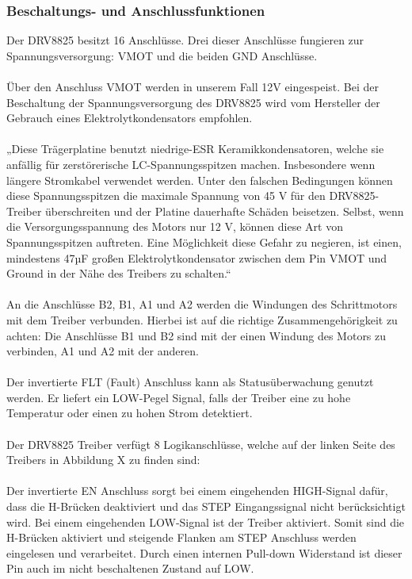 \subsubsection{Beschaltungs- und Anschlussfunktionen}
Der DRV8825 besitzt 16 Anschlüsse.
Drei dieser Anschlüsse fungieren zur Spannungsversorgung: VMOT und die beiden GND Anschlüsse. \\\\
Über den Anschluss VMOT werden in unserem Fall 12V eingespeist.
Bei der Beschaltung der Spannungsversorgung des DRV8825 wird vom Hersteller der Gebrauch eines Elektrolytkondensators empfohlen. \\\\
„Diese Trägerplatine benutzt niedrige-ESR Keramikkondensatoren, welche sie anfällig für zerstörerische LC-Spannungsspitzen machen.
Insbesondere wenn längere Stromkabel verwendet werden.
Unter den falschen Bedingungen können diese Spannungsspitzen die maximale Spannung von 45 V für den DRV8825-Treiber überschreiten und der Platine dauerhafte Schäden beisetzen.
Selbst, wenn die Versorgungsspannung des Motors nur 12 V, können diese Art von Spannungsspitzen auftreten.
Eine Möglichkeit diese Gefahr zu negieren, ist einen, mindestens 47µF großen Elektrolytkondensator zwischen dem Pin VMOT und Ground in der Nähe des Treibers zu schalten.“ \\\\
An die Anschlüsse B2, B1, A1 und A2 werden die Windungen des Schrittmotors mit dem Treiber verbunden.
Hierbei ist auf die richtige Zusammengehörigkeit zu achten:
Die Anschlüsse B1 und B2 sind mit der einen Windung des Motors zu verbinden, A1 und A2 mit der anderen. \\\\
Der invertierte FLT (Fault)  Anschluss kann als Statusüberwachung genutzt werden.
Er liefert ein LOW-Pegel Signal, falls der Treiber eine zu hohe Temperatur oder einen zu hohen Strom detektiert. \\\\
Der DRV8825 Treiber verfügt 8 Logikanschlüsse, welche auf der linken Seite des Treibers in Abbildung X zu finden sind: \\\\
Der invertierte EN Anschluss sorgt bei einem eingehenden HIGH-Signal dafür, dass die H-Brücken deaktiviert und das STEP Eingangssignal nicht berücksichtigt wird.
Bei einem eingehenden LOW-Signal ist der Treiber aktiviert.
Somit sind die H-Brücken aktiviert und steigende Flanken am STEP Anschluss werden eingelesen und verarbeitet.
Durch einen internen Pull-down Widerstand ist dieser Pin auch im nicht beschaltenen Zustand auf LOW. \\\\
